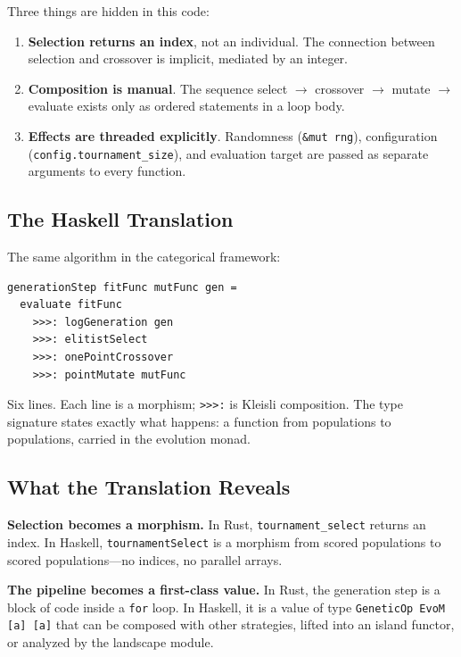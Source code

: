 \documentclass[dvipsnames,format=sigconf,anonymous=true,review=true]{acmart}
\begin{document}
Three things are hidden in this code:

\begin{enumerate}[nosep]
  \item \textbf{Selection returns an index}, not an individual. The connection between selection and crossover is implicit, mediated by an integer.
  \item \textbf{Composition is manual}. The sequence select $\to$ crossover $\to$ mutate $\to$ evaluate exists only as ordered statements in a loop body.
  \item \textbf{Effects are threaded explicitly}. Randomness (\texttt{\&mut rng}), configuration (\texttt{config.tournament\_size}), and evaluation target are passed as separate arguments to every function.
\end{enumerate}

\subsection{The Haskell Translation}

The same algorithm in the categorical framework:

\begin{lstlisting}[style=haskellstyle]
generationStep fitFunc mutFunc gen =
  evaluate fitFunc
    >>>: logGeneration gen
    >>>: elitistSelect
    >>>: onePointCrossover
    >>>: pointMutate mutFunc
\end{lstlisting}

Six lines. Each line is a morphism; \texttt{>{>}{>}:} is Kleisli composition. The type signature states exactly what happens: a function from populations to populations, carried in the evolution monad.

\subsection{What the Translation Reveals}

\textbf{Selection becomes a morphism.} In Rust, \texttt{tournament\_select} returns an index. In Haskell, \texttt{tournamentSelect} is a morphism from scored populations to scored populations---no indices, no parallel arrays.

\textbf{The pipeline becomes a first-class value.} In Rust, the generation step is a block of code inside a \texttt{for} loop. In Haskell, it is a value of type \texttt{GeneticOp EvoM [a] [a]} that can be composed with other strategies, lifted into an island functor, or analyzed by the landscape module.
\end{document}
